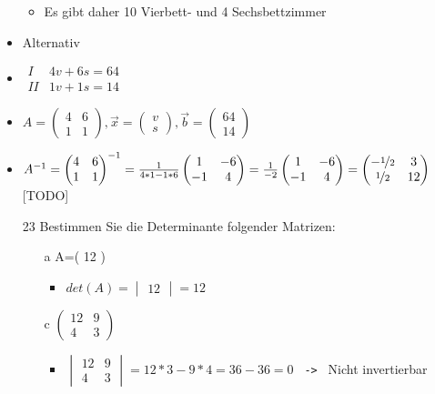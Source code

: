 \documentclass{article}
\begin{document}
\begin{itemize}
\begin{itemize}
			\item{Es gibt daher 10 Vierbett- und 4 Sechsbettzimmer}
		\end{itemize}
		\item{Alternativ}
		\item{$\begin{matrix} I & 4v+6s=64 \\ II & 1v+1s=14 \end{matrix}$}
		\item{$A=\begin{pmatrix} 4 & 6 \\ 1 & 1 \end{pmatrix},\vec{x}=\begin{pmatrix} v \\ s \end{pmatrix},\vec{b}=\begin{pmatrix} 64 \\ 14 \end{pmatrix}$}
		\item{$A^{-1}=\begin{pmatrix} 4 & 6 \\ 1 & 1 \end{pmatrix}^{-1}=\frac{1}{4*1-1*6}\begin{pmatrix} 1 & -6 \\ -1 & 4 \end{pmatrix}=\frac{1}{-2}\begin{pmatrix} 1 & -6 \\ -1 & 4 \end{pmatrix}=\begin{pmatrix} -\nicefrac{1}{2} & 3 \\ \nicefrac{1}{2} & 12 \end{pmatrix}$} [TODO]
		\item[23]{Bestimmen Sie die Determinante folgender Matrizen:}
		\begin{itemize}
			\item[a]{A=( 12 )}
			\begin{itemize}
				\item{$det(A)=\begin{vmatrix}12\end{vmatrix}=12$}
			\end{itemize}
			\item[c]{$\begin{pmatrix} 12 & 9 \\ 4 & 3 \end{pmatrix}$}
			\begin{itemize}
				\item{$\begin{vmatrix} 12 & 9 \\ 4 & 3 \end{vmatrix}=12*3-9*4=36-36=0$ \texttt{ -> } Nicht invertierbar}

\end{itemize}
\end{itemize}
\end{itemize}
\end{document}
